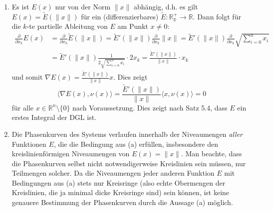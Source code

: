 \documentclass[a4paper]{article}
\begin{document}
\begin{enumerate}[label=(\alph*)]
    \item Es ist $E(x)$ nur von der Norm $\|x\|$ abhängig, d.h. es gilt $E(x) = \tilde{E}(\|x\|)$ für ein (differenzierbares) $\tilde{E}: \mathds{R^+_0} \to \mathds{R}$. Dann folgt für die $k$-te partielle Ableitung von $E$ am Punkt $x \neq 0$:
    \begin{align*}
        \frac{\partial}{\partial x_k} E (x) &= \frac{\partial}{\partial x_k} \tilde{E}(\|x\|) = \tilde{E}'(\|x\|) \frac{\partial}{\partial x_k} \|x\| = \tilde{E}'(\|x\|) \frac{\partial}{\partial x_k} \sqrt{\sum_{i = 0}^n x_i} \\
        &= \tilde{E}'(\|x\|) \frac{1}{2 \sqrt{\sum_{i = 0}^n x_i}}  \cdot 2 x_k =  \frac{\tilde{E}'(\|x\|)}{\|x\|} \cdot x_k
    \end{align*}
    und somit $\nabla E(x) = \frac{\tilde{E}'(\|x\|)}{\|x\|} x$. Dies zeigt 
    \begin{equation*}
        \langle \nabla E(x), \nu(x) \rangle = \frac{\tilde{E}'(\|x\|)}{\|x\|} \langle x, \nu(x) \rangle = 0
    \end{equation*}
    für alle $x \in \mathds{R}^n \setminus \{0\}$ nach Voraussetzung. Dies zeigt nach Satz 5.4, dass $E$ ein erstes Integral der DGL ist.
    \item Die Phasenkurven des Systems verlaufen innerhalb der Niveaumengen \textit{aller} Funktionen $E$, die die Bedingung aus (a) erfüllen, insbesondere den kreislinienförmigen Niveaumengen von $E(x) = \|x\|$. Man beachte, dass die Phasenkurven selbst nicht notwendigerweise Kreislinien sein müssen, nur Teilmengen solcher.
    Da die Niveaumengen jeder anderen Funktion $E$ mit Bedingungen aus (a) stets nur Kreisringe (also echte Obermengen der Kreislinien, die ja minimal dicke Kreisringe sind) sein können, ist keine genauere Bestimmung der Phasenkurven durch die Aussage (a) möglich.
\end{enumerate}
\end{document}
